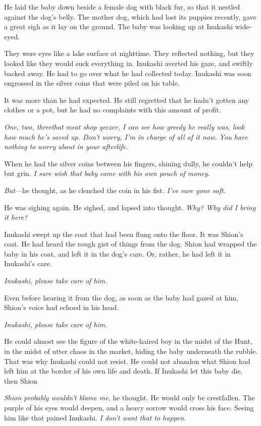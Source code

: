 He laid the baby down beside a female dog with black fur, so that it
nestled against the dog's belly. The mother dog, which had lost its
puppies recently, gave a great sigh as it lay on the ground. The baby
was looking up at Inukashi wide-eyed.

They were eyes like a lake surface at nighttime. They reflected nothing,
but they looked like they would suck everything in. Inukashi averted his
gaze, and swiftly backed away. He had to go over what he had collected
today. Inukashi was soon engrossed in the silver coins that were piled
on his table.

It was more than he had expected. He still regretted that he hadn't
gotten any clothes or a pot, but he had no complaints with this amount
of profit.

\emph{One, two, three\el that meat shop geezer, I can see how greedy he really
was, look how much he's saved up. Don't worry, I'm in charge of all of
it now. You have nothing to worry about in your afterlife.}

When he had the silver coins between his fingers, shining dully, he
couldn't help but grin. \emph{I sure wish that baby came with his own pouch of
money.}

\emph{But}---he thought, as he clenched the coin in his fist. \emph{I've sure gone
soft.}

He was sighing again. He sighed, and lapsed into thought. \emph{Why? Why did I
bring it here?}

Inukashi swept up the coat that had been flung onto the floor. It was
Shion's coat. He had heard the rough gist of things from the dog. Shion
had wrapped the baby in his coat, and left it in the dog's care. Or,
rather, he had left it in Inukashi's care.

\emph{Inukashi, please take care of him.}

Even before hearing it from the dog, as soon as the baby had gazed at
him, Shion's voice had echoed in his head.

\emph{Inukashi, please take care of him.}

He could almost see the figure of the white-haired boy in the midst of
the Hunt, in the midst of utter chaos in the market, hiding the baby
underneath the rubble. That was why Inukashi could not resist. He could
not abandon what Shion had left him at the border of his own life and
death. If Inukashi let this baby die, then Shion\el 

\emph{Shion probably wouldn't blame me}, he thought. He would only be
crestfallen. The purple of his eyes would deepen, and a heavy sorrow
would cross his face. Seeing him like that pained Inukashi. \emph{I don't\el 
want that to happen.}

